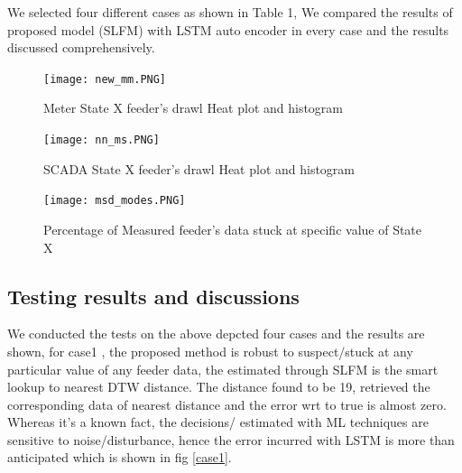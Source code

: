 \documentclass[conference]{IEEEtran}
\begin{document}
We selected four different cases as shown in Table 1, We compared the results of proposed model (SLFM) with LSTM auto encoder in every case  and the results discussed comprehensively.
\begin{figure}[!ht]
\texttt{[image: new\_mm.PNG]}
\caption{Meter State X feeder's drawl Heat plot and histogram }
\label{hist1}
\end{figure}
\begin{figure}[!ht]
\texttt{[image: nn\_ms.PNG]}
\caption{SCADA State X feeder's drawl Heat plot and histogram }
\label{hist2}
\end{figure}
\begin{figure}
\texttt{[image: msd\_modes.PNG]}
\caption{Percentage of Measured feeder's data stuck at specific value of State X}
\label{per3}
\end{figure}


\subsection{Testing results and discussions}

We conducted the tests on the above depcted four cases and the results are shown, for case1 , the proposed method is robust to suspect/stuck at any particular value of any feeder data, the estimated through SLFM is the smart lookup to nearest DTW distance. The distance found to be 19, retrieved the corresponding data of nearest distance and the error wrt to true is almost zero. Whereas it's a known fact, the decisions/ estimated with ML techniques are sensitive to noise/disturbance, hence the error incurred with LSTM is more than anticipated which is shown in fig \ref {case1}.\\
\end{document}
